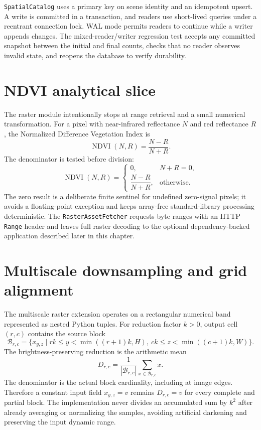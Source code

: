 \texttt{SpatialCatalog} uses a primary key on scene identity and an idempotent upsert. A write is
committed in a transaction, and readers use short-lived queries under a reentrant connection lock.
WAL mode permits readers to continue while a writer appends changes. The mixed-reader/writer
regression test accepts any committed snapshot between the initial and final counts, checks that
no reader observes invalid state, and reopens the database to verify durability.

\section{NDVI analytical slice}

The raster module intentionally stops at range retrieval and a small numerical transformation.
For a pixel with near-infrared reflectance \(N\) and red reflectance \(R\), the Normalized
Difference Vegetation Index is
\[
\operatorname{NDVI}(N,R)=\frac{N-R}{N+R}.
\]
The denominator is tested before division:
\[
\operatorname{NDVI}(N,R)=
\begin{cases}
0, & N+R=0,\\[2mm]
\dfrac{N-R}{N+R}, & \text{otherwise}.
\end{cases}
\]
The zero result is a deliberate finite sentinel for undefined zero-signal pixels; it avoids a
floating-point exception and keeps array-free standard-library processing deterministic. The
\texttt{RasterAssetFetcher} requests byte ranges with an HTTP \texttt{Range} header and leaves
full raster decoding to the optional dependency-backed application described later in this chapter.

\section{Multiscale downsampling and grid alignment}

The multiscale raster extension operates on a rectangular numerical band represented as nested
Python tuples. For reduction factor \(k>0\), output cell \((r,c)\) contains the source block
\[
\mathcal{B}_{r,c}=
\{x_{y,z}\mid rk\leq y<\min((r+1)k,H),\
ck\leq z<\min((c+1)k,W)\}.
\]
The brightness-preserving reduction is the arithmetic mean
\[
D_{r,c}=\frac{1}{|\mathcal{B}_{r,c}|}
\sum_{x\in\mathcal{B}_{r,c}}x.
\]
The denominator is the actual block cardinality, including at image edges. Therefore a constant
input field \(x_{y,z}=v\) remains \(D_{r,c}=v\) for every complete and partial block. The
implementation never divides an accumulated sum by \(k^2\) after already averaging or normalizing
the samples, avoiding artificial darkening and preserving the input dynamic range.

